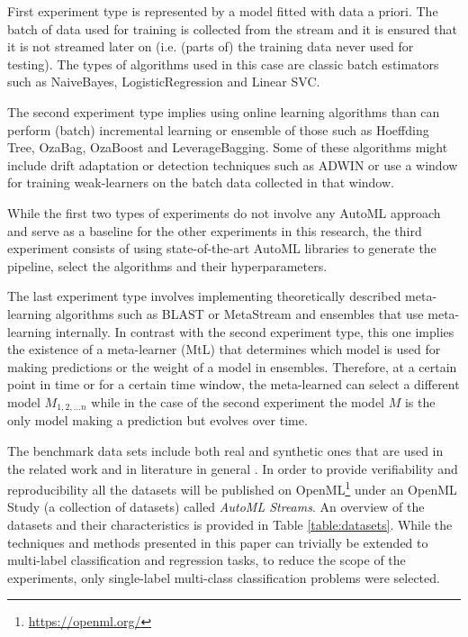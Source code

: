 \documentclass{sig-alternate-br}
\begin{document}
First experiment type is represented by a model fitted with data a priori. The batch of data used for training is collected from the stream and it is ensured that it is not streamed later on (i.e. (parts of) the training data never used for testing). The types of algorithms used in this case are classic batch estimators such as NaiveBayes, LogisticRegression and Linear SVC.

The second experiment type implies using online learning algorithms than can perform (batch) incremental learning or ensemble of those such as Hoeffding Tree, OzaBag, OzaBoost and LeverageBagging. Some of these algorithms might include drift adaptation or detection techniques such as ADWIN or use a window for training weak-learners on the batch data collected in that window.  

While the first two types of experiments do not involve any AutoML approach and serve as a baseline for the other experiments in this research, the third experiment consists of using state-of-the-art AutoML libraries to generate the pipeline, select the algorithms and their hyperparameters. 

The last experiment type involves implementing theoretically described meta-learning algorithms such as BLAST or MetaStream and ensembles that use meta-learning internally. In contrast with the second experiment type, this one implies the existence of a meta-learner (MtL) that determines which model is used for making predictions or the weight of a model in ensembles. Therefore, at a certain point in time or for a certain time window, the meta-learned can select a different model $M_{1,2, ... n}$ while in the case of the second experiment the model $M$ is the only model making a prediction but evolves over time.

The benchmark data sets include both real and synthetic ones that are used in the related work and in literature in general \cite{van2016massively}. In order to provide verifiability and reproducibility all the datasets will be published on OpenML\footnote{\url{https://openml.org/}} under an OpenML Study (a collection of datasets) called \textit{AutoML Streams}. An overview of the datasets and their characteristics is provided in Table \ref{table:datasets}. While the techniques and methods presented in this paper can trivially be extended to multi-label classification and regression tasks, to reduce the scope of the experiments, only single-label multi-class classification problems were selected.   
\end{document}
